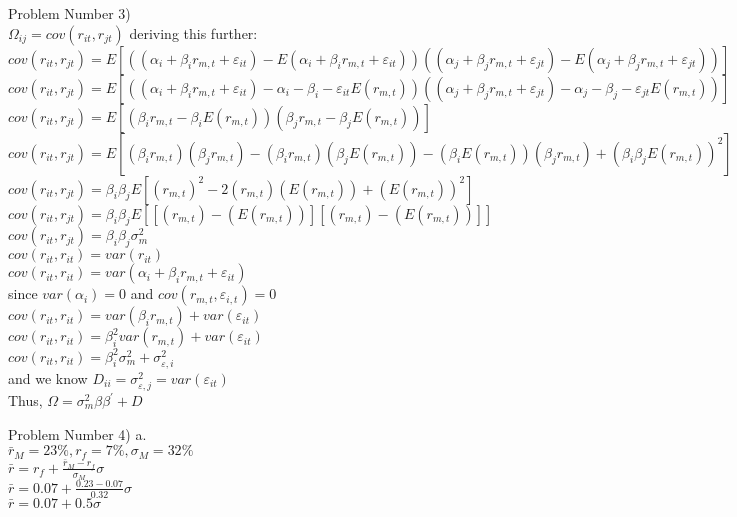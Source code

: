 \documentclass[11pt]{article}
\begin{document}
Problem Number 3)\\
$\Omega_{ij} = cov(r_{it},r_{jt})$ deriving this further:\\
$cov(r_{it},r_{jt}) = E[((\alpha_{i} + \beta_{i} r_{m,t} + \varepsilon_{it}) - E(\alpha_{i} + \beta_{i} r_{m,t} + \varepsilon_{it})) ((\alpha_{j} + \beta_{j} r_{m,t} + \varepsilon_{jt}) - E(\alpha_{j} + \beta_{j} r_{m,t} + \varepsilon_{jt}))]$\\
$cov(r_{it},r_{jt}) = E[((\alpha_{i} + \beta_{i} r_{m,t} + \varepsilon_{it}) - \alpha_{i} - \beta_{i} - \varepsilon_{it} E(r_{m,t})) ((\alpha_{j} + \beta_{j} r_{m,t} + \varepsilon_{jt}) - \alpha_{j} - \beta_{j} - \varepsilon_{jt} E(r_{m,t}))]$\\
$cov(r_{it},r_{jt}) = E[(\beta_{i} r_{m,t} - \beta_{i} E(r_{m,t})) (\beta_{j} r_{m,t} - \beta_{j} E(r_{m,t}))]$\\
$cov(r_{it},r_{jt}) = E[(\beta_{i} r_{m,t})(\beta_{j} r_{m,t}) - (\beta_{i} r_{m,t})(\beta_{j} E(r_{m,t})) - (\beta_{i} E(r_{m,t}))(\beta_{j} r_{m,t}) + (\beta_{i} \beta_{j} E(r_{m,t}))^{2}]$\\
$cov(r_{it},r_{jt}) = \beta_{i} \beta_{j} E[(r_{m,t})^{2} - 2 (r_{m,t})(E(r_{m,t})) + (E(r_{m,t}))^{2}]$\\
$cov(r_{it},r_{jt}) = \beta_{i} \beta_{j} E[[(r_{m,t}) - (E(r_{m,t}))][(r_{m,t}) - (E(r_{m,t}))]]$\\
$cov(r_{it},r_{jt}) = \beta_{i} \beta_{j} \sigma_{m}^{2}$\\

$cov(r_{it},r_{it}) = var(r_{it})$\\
$cov(r_{it},r_{it}) = var(\alpha_{i} + \beta_{i} r_{m,t} + \varepsilon_{it})$\\
since $var(\alpha_{i}) = 0$ and $cov(r_{m,t},\varepsilon_{i,t}) = 0$\\

$cov(r_{it},r_{it}) = var(\beta_{i} r_{m,t}) + var(\varepsilon_{it})$\\
$cov(r_{it},r_{it}) = \beta_{i}^{2} var(r_{m,t}) + var(\varepsilon_{it})$\\
$cov(r_{it},r_{it}) = \beta_{i}^{2} \sigma_{m}^{2} + \sigma_{\varepsilon,i}^{2}$\\
and we know $D_{ii} = \sigma_{\varepsilon,j}^{2} = var(\varepsilon_{it})$\\

Thus, $\Omega = \sigma_{m}^{2} \beta \beta^{'} + D$





Problem Number 4) a.\\
$\bar{r}_{M} = 23 \%, r_{f} = 7 \%, \sigma_{M} = 32 \%$\\
$\bar{r} = r_{f} + \frac{\bar{r}_{M} - r_{f}}{\sigma_{M}} \sigma$\\
$\bar{r} = 0.07 + \frac{0.23 - 0.07}{0.32} \sigma$\\
$\bar{r} = 0.07 + 0.5 \sigma$\\
\end{document}
